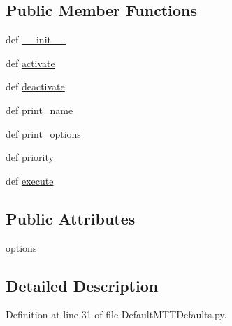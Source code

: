 \subsection*{Public Member Functions}
\begin{DoxyCompactItemize}
\item 
def \hyperlink{classDefaultMTTDefaults_1_1DefaultMTTDefaults_af45ae89ffdda25b5db56cc32d6f38617}{\-\_\-\-\_\-init\-\_\-\-\_\-}
\item 
def \hyperlink{classDefaultMTTDefaults_1_1DefaultMTTDefaults_ab168e4b76bd07ff868f6d8c8dcfbabcd}{activate}
\item 
def \hyperlink{classDefaultMTTDefaults_1_1DefaultMTTDefaults_abbdeb62905e733e0145243e238991e1b}{deactivate}
\item 
def \hyperlink{classDefaultMTTDefaults_1_1DefaultMTTDefaults_a39fc17ab14b57f8aeaa7df1a6b32f059}{print\-\_\-name}
\item 
def \hyperlink{classDefaultMTTDefaults_1_1DefaultMTTDefaults_aedf1031336bf735bb00dcc8d80a0bd4a}{print\-\_\-options}
\item 
def \hyperlink{classDefaultMTTDefaults_1_1DefaultMTTDefaults_a22c85638c99e8a0dcb01d31c326bfc55}{priority}
\item 
def \hyperlink{classDefaultMTTDefaults_1_1DefaultMTTDefaults_a2ccbda4994ea610724763268ab05181e}{execute}
\end{DoxyCompactItemize}
\subsection*{Public Attributes}
\begin{DoxyCompactItemize}
\item 
\hyperlink{classDefaultMTTDefaults_1_1DefaultMTTDefaults_a733e1af4da36392ce6126d79c61aba0b}{options}
\end{DoxyCompactItemize}


\subsection{Detailed Description}


Definition at line 31 of file Default\-M\-T\-T\-Defaults.\-py.



